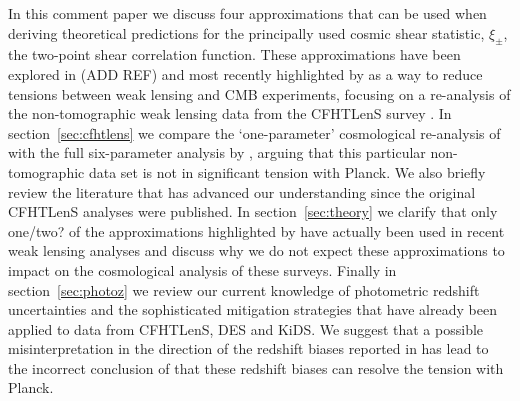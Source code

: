 \documentclass[preprint]{aastex}
\begin{document}
In this comment paper we discuss four approximations that can be used when deriving theoretical predictions for the principally used cosmic shear statistic, $\xi_\pm$, the two-point shear correlation function.   These approximations have been explored in (ADD REF) and most recently highlighted by \citet{kitching/etal:2016} as a way to reduce tensions between weak lensing and CMB experiments, focusing on a re-analysis of the non-tomographic weak lensing data from the CFHTLenS survey \citep{kilbinger/etal:2013}.    In section~\ref{sec:cfhtlens} we compare the `one-parameter' cosmological re-analysis of \citet{kitching/etal:2016} with the full six-parameter analysis by \citet{kilbinger/etal:2013}, arguing that this particular non-tomographic data set is not in significant tension with Planck.  We also briefly review the literature that has advanced our understanding since the original CFHTLenS analyses were published.  In section~\ref{sec:theory} we clarify that only one/two? of the approximations highlighted by \citet{kitching/etal:2016} have actually been used in recent weak lensing analyses \citep{joudaki/etal:2016, hildebrandt/etal:2016, joudaki/etal:2017} and discuss why we do not expect these approximations to impact on the cosmological analysis of these surveys.    Finally in section~\ref{sec:photoz} we review our current knowledge of photometric redshift uncertainties and the sophisticated mitigation strategies that have already been applied to data from CFHTLenS, DES and KiDS.  We suggest that a possible misinterpretation in the direction of the redshift biases reported in \citet{choi/etal:2016} has lead to the incorrect conclusion of \citet{kitching/etal:2016} that these redshift biases can resolve the tension with Planck.  

\end{document}
